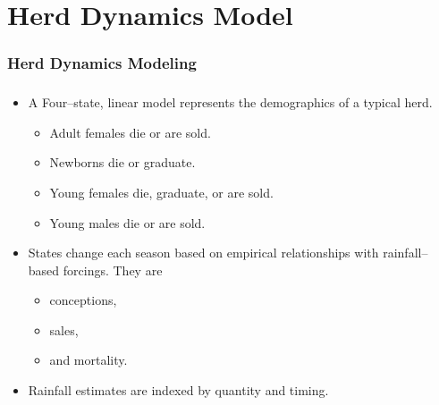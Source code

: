 \documentclass[mathserif]{beamer}
\begin{document}
\section{Herd Dynamics Model}

\begin{frame}
\frametitle{Herd Dynamics Modeling}
\tableofcontents[currentsection]
\end{frame}

\begin{frame}
\begin{center}
\frametitle{\insertsection}
\begin{itemize}
\item A Four--state, linear model represents the demographics of a typical herd.
\begin{itemize}
\item Adult females die or are sold.
\item Newborns die or graduate.
\item Young females die, graduate, or are sold.
\item Young males die or are sold.
\end{itemize}
\item States change each season based on empirical relationships with rainfall--based forcings. They are
\begin{itemize}
\item conceptions,
\item sales,
\item and mortality.
\end{itemize}
\item Rainfall estimates are indexed by quantity and timing.
\end{itemize}
\end{center}
\end{frame}
\end{document}
